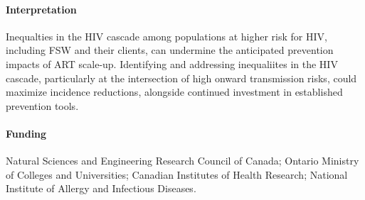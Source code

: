 \paragraph{Interpretation}
Inequalties in the HIV cascade among populations at higher risk for HIV,  %
including FSW and their clients,
can undermine the anticipated prevention impacts of ART scale-up.
Identifying and addressing inequaliites in the HIV cascade, particularly at the intersection of high onward transmission risks, 
could maximize incidence reductions, %
alongside continued investment in established prevention tools. %
\paragraph{Funding}
Natural Sciences and Engineering Research Council of Canada;
Ontario Ministry of Colleges and Universities;
Canadian Institutes of Health Research;
National Institute of Allergy and Infectious Diseases.
